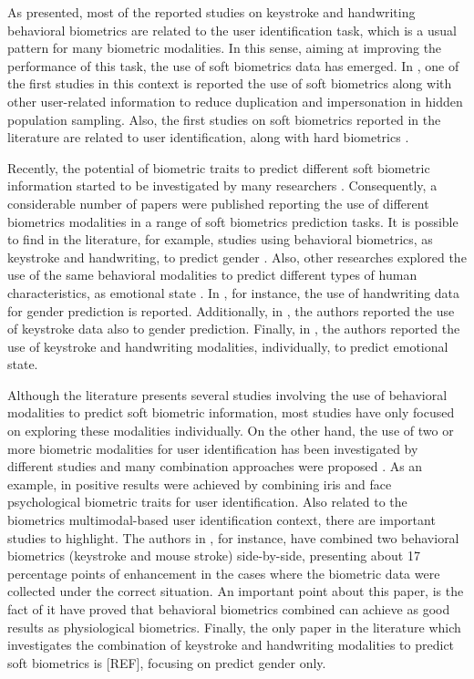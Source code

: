 \documentclass[conference]{IEEEtran}
\begin{document}
As presented, most of the reported studies on keystroke and handwriting behavioral biometrics are related to the user identification task, which is a usual pattern for many biometric modalities. 
In this sense, aiming at improving the performance of this task, the use of soft biometrics data has emerged. In \cite{first-study}, one of the first studies in this context is reported the use of soft biometrics along with other user-related information to reduce duplication and impersonation in hidden population sampling. Also, the first studies on soft biometrics reported in the literature are related to user identification, along with hard biometrics \cite{jain-assist, jain-personal-recog, jain-integrating}.

Recently,  the potential of biometric traits to predict different soft biometric information started to be investigated by many researchers \cite{cheng-hw-gender, hw-gender1, ks-emotion1, cheng-emotional, cheng-thesis}. 
Consequently, a considerable number of papers were published reporting the use of different biometrics modalities in a range of soft biometrics prediction tasks. It is possible to find in the literature, for example,  studies using behavioral biometrics, as keystroke and handwriting, to predict gender \cite{cheng-hw-gender, hw-gender1}. 
Also, other researches explored the use of the same behavioral modalities to predict different types of human characteristics, as emotional state \cite{ks-emotion1, cheng-emotional, cheng-thesis}. In \cite{hw-gender1, hw-gender2, hw-gender3}, for instance, the use of handwriting data for gender prediction is reported. Additionally, in \cite{cheng-thesis, ks-gender1}, the authors reported the use of keystroke data also to gender prediction. Finally, in \cite{cheng-emotional, ks-emotion1, ks-emotion2-mouse}, the authors reported the use of keystroke and handwriting modalities, individually, to predict emotional state.

Although the literature presents several studies involving the use of behavioral modalities to predict soft biometric information, most studies have only focused on exploring these modalities individually. On the other hand, the use of two or more biometric modalities for user identification has been investigated by different studies and many combination approaches were proposed \cite{multimodal-biometrics, multibiometric, handbook-multibiometrics}. As an example, in \cite{face-iris-comb} positive results were achieved by combining iris and face psychological biometric traits for user identification. 
Also related to the biometrics multimodal-based user identification context, there are important studies to highlight. The authors in \cite{marjorie-comb}, for instance, have combined two behavioral biometrics (keystroke and mouse stroke) side-by-side, presenting about 17 percentage points of enhancement in the cases where the biometric data were collected under the correct situation. An important point about this paper, is the fact of it have proved that behavioral biometrics combined can achieve as good results as physiological biometrics.
Finally, the only paper in the literature which investigates the combination  
of keystroke and handwriting modalities to predict soft biometrics is [REF], focusing on predict gender only.
\end{document}
